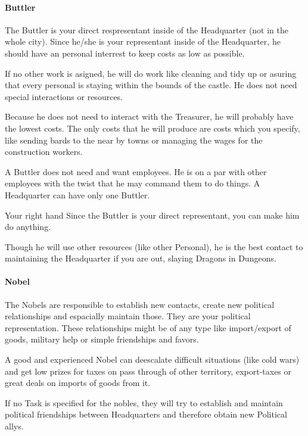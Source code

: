 \documentclass[10pt,twoside,twocolumn,openany]{book}
\begin{document}
\paragraph{Buttler}

The Buttler is your direct respresentant inside of the Headquarter (not in the whole city). Since he/she is your representant inside of the Headquarter, he should have an personal interrest to keep costs as low as possible.

If no other work is asigned, he will do work like cleaning and tidy up or asuring that every personal is staying within the bounds of the castle. He does not need special interactions or resources. 

Because he does not need to interact with the Treasurer, he will probably have the lowest costs. The only costs that he will produce are costs which you specify, like sending bards to the near by towns or managing the wages for the construction workers.

A Buttler does not need and want employees. He is on a par with other employees with the twist that he may command them to do things. A Headquarter can have only one Buttler.

\begin{paperbox}{Your right hand}
Since the Buttler is your direct representant, you can make him do anything. 

Though he will use other resources (like other Personal), he is the best contact to maintaining the Headquarter if you are out, slaying Dragons in Dungeons.
\end{paperbox}

\paragraph{Nobel}

The Nobels are responsible to establish new contacts, create new political relationships and espacially maintain those. They are your political representation. These relationships might be of any type like import/export of goods, military help or simple friendships and favors.

A good and experienced Nobel can deescalate difficult situations (like cold wars) and get low prizes for taxes on pass through of other territory, export-taxes or great deals on imports of goods from it.

If no Task is specified for the nobles, they will try to establish and maintain political friendships between Headquarters and therefore obtain new Political allys.
\end{document}
